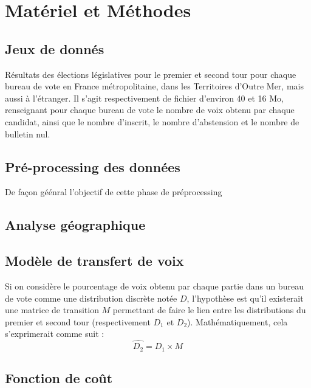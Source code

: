 \documentclass[11pt]{article}
\begin{document}
    \newpage
    \section{Matériel et Méthodes}

        \subsection*{Jeux de donnés}
            Résultats des élections législatives pour le premier et second tour pour chaque bureau de vote en France métropolitaine, dans les Territoires d'Outre Mer, mais aussi à  l'étranger. Il s'agit respectivement de fichier d'environ 40 et 16 Mo, renseignant pour chaque bureau de vote le nombre de voix obtenu par chaque candidat, ainsi que le nombre d'inscrit, le nombre d'abstension et le nombre de bulletin nul.
        
        \subsection*{Pré-processing des données}
            De façon géénral l'objectif de cette phase de préprocessing 

        \subsection*{Analyse géographique}


        \subsection*{Modèle de transfert de voix}
            Si on considère le pourcentage de voix obtenu par chaque partie dans un bureau de vote comme une distribution discrète notée $D$, l'hypothèse est qu'il existerait une matrice de transition $M$ permettant de faire le lien entre les distributions du premier et second tour (respectivement $D_1$ et $D_2$). Mathématiquement, cela s'exprimerait comme suit :
            \begin{equation}
                \hat{D_2} = D_1 \times M
            \end{equation}

        \subsection*{Fonction de coût}
\end{document}
